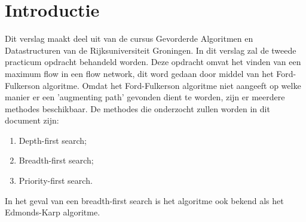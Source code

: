 \chapter{Introductie}

Dit verslag maakt deel uit van de cursus Gevorderde Algoritmen en Datastructuren van de Rijksuniversiteit Groningen. 
In dit verslag zal de tweede practicum opdracht behandeld worden. 
Deze opdracht omvat het vinden van een maximum flow in een flow network, dit word gedaan door middel van het Ford-Fulkerson algoritme.
Omdat het Ford-Fulkerson algoritme niet aangeeft op welke manier er een 'augmenting path' gevonden dient te worden, zijn er meerdere methodes beschikbaar.
De methodes die onderzocht zullen worden in dit document zijn:

\begin{enumerate}
	\item Depth-first search;
	\item Breadth-first search;
	\item Priority-first search.
\end{enumerate}

In het geval van een breadth-first search is het algoritme ook bekend als het Edmonds-Karp algoritme.